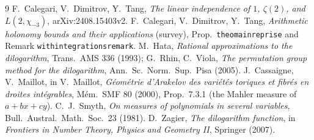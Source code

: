 \documentclass[11pt]{amsart}
\theoremstyle{remark}
\begin{document}
\begin{thebibliography}{9}
 F.~Calegari, V.~Dimitrov, Y.~Tang, \emph{The linear independence of $1$, $\zeta(2)$, and $L(2,\chi_{-3})$}, arXiv:2408.15403v2.
 F.~Calegari, V.~Dimitrov, Y.~Tang, \emph{Arithmetic holonomy bounds and their applications} (survey), Prop.\ \texttt{theomainreprise} and Remark \texttt{withintegrationsremark}.
 M.~Hata, \emph{Rational approximations to the dilogarithm}, Trans.\ AMS 336 (1993); G.~Rhin, C.~Viola, \emph{The permutation group method for the dilogarithm}, Ann.\ Sc.\ Norm.\ Sup.\ Pisa (2005).
 J.~Cassaigne, V.~Maillot, in V.~Maillot, \emph{G\'eom\'etrie d'Arakelov des vari\'et\'es toriques et fibr\'es en droites int\'egrables}, M\'em.\ SMF 80 (2000), Prop.\ 7.3.1 (the Mahler measure of $a+bx+cy$).
 C.~J.~Smyth, \emph{On measures of polynomials in several variables}, Bull.\ Austral.\ Math.\ Soc.\ 23 (1981).
 D.~Zagier, \emph{The dilogarithm function}, in \emph{Frontiers in Number Theory, Physics and Geometry II}, Springer (2007).
\end{thebibliography}
\end{document}
